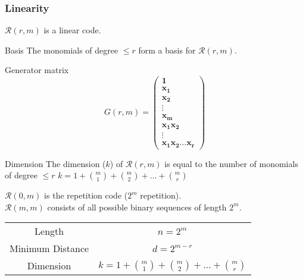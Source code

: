 \documentclass[xcolor=xvgnames]{beamer}
\newcommand{\RM}[2]{\ensuremath{\mathcal{R}(#1,#2)}}
\newcommand{\V}[1]{\ensuremath{\mathbf{#1}}}
\begin{document}

\begin{frame}
 \frametitle{Linearity}
\begin{Lemma}
  $\RM{r}{m}$ is a linear code.
\end{Lemma}

\begin{block}{Basis}
  The monomials of degree $\leq r$ form a basis for $\RM{r}{m}$.
\end{block}

Generator matrix
\begin{equation*}
  \label{eq:5}
  G(r,m) =
  \begin{pmatrix}
    \V{1} \\
    \V{x_1} \\
    \V{x_2} \\
    \vdots \\
    \V{x_m} \\
    \V{x_1x_2} \\
    \vdots \\
    \V{x_1x_2\ldots x_r}
  \end{pmatrix}
\end{equation*}

\end{frame}


\begin{frame}
 \begin{block}{Dimension}
  The dimension ($k$) of $\RM{r}{m}$ is equal to the  number of monomials of degree $\leq r$ \quad $ k= 1+\binom{m}{1}+\binom{m}{2}+\ldots+\binom{m}{r} $
\end{block}

$\RM{0}{m} $ is the repetition code ($2^m$ repetition).\\
$\RM{m}{m}$ consists of all possible binary sequences of length $2^m$.

\begin{center}
\begin{tabular}[center]{|c|c|}
\hline
Length & $n = 2^m$ \\
Minimum Distance & $d = 2^{m-r}$ \\
Dimension & $k= 1+\binom{m}{1}+\binom{m}{2}+\ldots+\binom{m}{r}$ \\
\hline
\end{tabular}
\end{center}

\end{frame}
\end{document}
